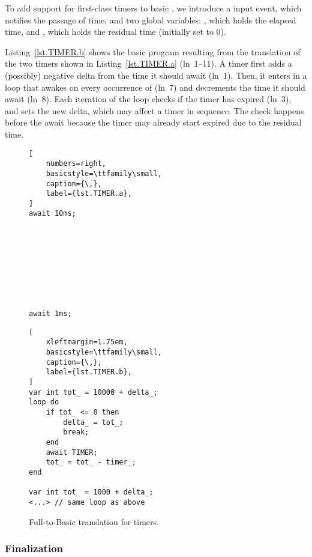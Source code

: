 To add support for first-class timers to basic \CEU , we introduce a
 input event, which notifies the passage of time, and two global
variables: , which holds the elapsed time, and ,
which holds the residual time (initially set to 0).

Listing~\ref{lst.TIMER.b} shows the basic \CEU program resulting from the
translation of the two timers shown in Listing~\ref{lst.TIMER.a} (ln~1--11).
A timer first adds a (possibly) negative delta from the time it should await
(ln~1).  Then, it enters in a loop that awakes on every occurrence of
 (ln~7) and decrements the time it should await (ln~8).  Each
iteration of the loop checks if the timer has expired (ln~3), and sets the
new delta, which may affect a timer in sequence.  The check happens before
the await because the timer may already start expired due to the residual
time.

\begin{figure}[!ht]
\begin{minipage}[t]{0.33\linewidth}
\begin{lstlisting}[
    numbers=right,
    basicstyle=\ttfamily\small,
    caption={\,},
    label={lst.TIMER.a},
]
await 10ms;









await 1ms;

\end{lstlisting}
\end{minipage}
%
\begin{minipage}[t]{0.63\linewidth}
\begin{lstlisting}[
    xleftmargin=1.75em,
    basicstyle=\ttfamily\small,
    caption={\,},
    label={lst.TIMER.b},
]
var int tot_ = 10000 + delta_;
loop do
    if tot_ <= 0 then
        delta_ = tot_;
        break;
    end
    await TIMER;
    tot_ = tot_ - timer_;
end

var int tot_ = 1000 + delta_;
<...> // same loop as above
\end{lstlisting}
\end{minipage}
\caption{ Full-to-Basic translation for timers. }
\label{lst.TIMER}
\end{figure}

\subsubsection*{Finalization}

